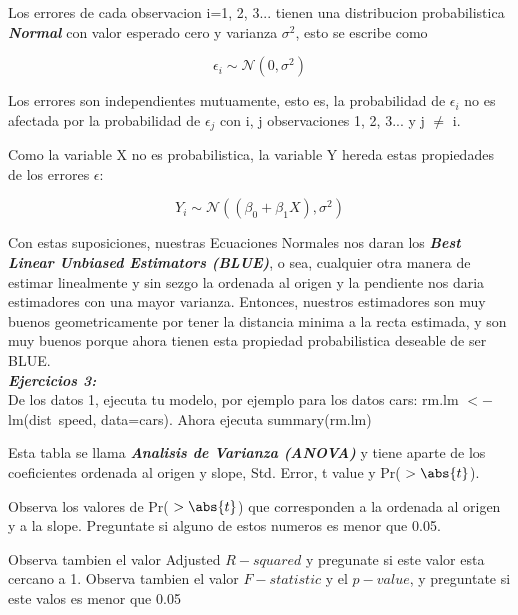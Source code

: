 \documentclass[letterpaper,11pt]{article}\usepackage[]{graphicx}\usepackage[]{color}
\begin{document}
\begin{itemization}
\item Los errores de cada observacion i=1, 2, 3... tienen una distribucion probabilistica \textbf{\textit{Normal}} con valor esperado cero y varianza $\sigma^{2}$, esto se escribe como

	\begin{equation}
\epsilon_{i} \sim \mathcal{N}(0,\sigma^{2})
	\end{equation}

\item Los errores son independientes mutuamente, esto es, la probabilidad de $\epsilon_{i}$ no es afectada por la probabilidad de 
$\epsilon_{j}$ con i, j observaciones 1, 2, 3... y j $\neq$ i.

Como la variable X no es probabilistica, la variable Y hereda estas propiedades de los errores $\epsilon$:

	\begin{equation}
Y_{i} \sim \mathcal{N}( (\beta_{0} + \beta_{1} X),\sigma^{2})
	\end{equation}
	
Con estas suposiciones, nuestras Ecuaciones Normales nos daran los \textbf{\textit{Best Linear Unbiased Estimators (BLUE)}},
o sea, cualquier otra manera de estimar linealmente y sin sezgo la ordenada al origen y la pendiente nos daria estimadores con una mayor varianza. Entonces, nuestros estimadores son muy buenos geometricamente por tener la distancia minima a la recta estimada, y son muy buenos porque ahora tienen esta propiedad probabilistica deseable de ser BLUE.\\

\textbf{\textit{Ejercicios 3:}}\\

De los datos 1, ejecuta tu modelo, por ejemplo para los datos cars: rm.lm $<-$ lm(dist~speed, data=cars).
Ahora ejecuta summary(rm.lm)

Esta tabla se llama \textbf{\textit{Analisis de Varianza (ANOVA)}} y tiene aparte de los coeficientes ordenada al origen y slope,
Std. Error, t value y Pr( $> \abs{t}$).

Observa los valores de Pr( $> \abs{t}$) que corresponden a la ordenada al origen y a la slope.
Preguntate si alguno de estos numeros es menor que 0.05.

Observa tambien el valor Adjusted $R-squared$ y pregunate si este valor esta cercano a 1.
Observa tambien el valor $F-statistic$ y el $p-value$, y preguntate si este valos es menor que 0.05


\end{itemization}
\end{document}
